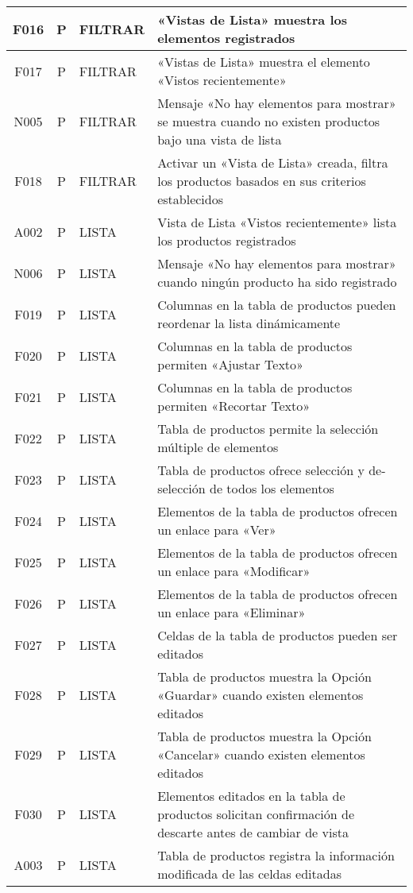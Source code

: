 \begin{landscape}
{\begin{longtable}[htb]{|c|c|p{5.0cm}|p{14.0cm}|}
F016 & P & FILTRAR & «Vistas de Lista» muestra los elementos registrados \\ \hline
F017 & P & FILTRAR & «Vistas de Lista» muestra el elemento «Vistos recientemente» \\ \hline
N005 & P & FILTRAR & Mensaje «No hay elementos para mostrar» se muestra cuando no existen productos bajo una vista de lista \\ \hline
F018 & P & FILTRAR & Activar un «Vista de Lista» creada, filtra los productos basados en sus criterios establecidos \\ \hline
A002 & P & LISTA & Vista de Lista «Vistos recientemente» lista los productos registrados \\ \hline
N006 & P & LISTA & Mensaje «No hay elementos para mostrar» cuando ningún producto ha sido registrado \\ \hline
F019 & P & LISTA & Columnas en la tabla de productos pueden reordenar la lista dinámicamente \\ \hline
F020 & P & LISTA & Columnas en la tabla de productos permiten «Ajustar Texto» \\ \hline
F021 & P & LISTA & Columnas en la tabla de productos permiten «Recortar Texto» \\ \hline
F022 & P & LISTA & Tabla de productos permite la selección múltiple de elementos \\ \hline
F023 & P & LISTA & Tabla de productos ofrece selección y de-selección de todos los elementos \\ \hline
F024 & P & LISTA & Elementos de la tabla de productos ofrecen un enlace para «Ver» \\ \hline
F025 & P & LISTA & Elementos de la tabla de productos ofrecen un enlace para «Modificar» \\ \hline
F026 & P & LISTA & Elementos de la tabla de productos ofrecen un enlace para «Eliminar» \\ \hline
F027 & P & LISTA & Celdas de la tabla de productos pueden ser editados \\ \hline
F028 & P & LISTA & Tabla de productos muestra la Opción «Guardar» cuando existen elementos editados \\ \hline
F029 & P & LISTA & Tabla de productos muestra la Opción «Cancelar» cuando existen elementos editados \\ \hline
F030 & P & LISTA & Elementos editados en la tabla de productos solicitan confirmación de descarte antes de cambiar de vista \\ \hline
A003 & P & LISTA & Tabla de productos registra la información modificada de las celdas editadas \\ \hline

\end{longtable}}
\end{landscape}
